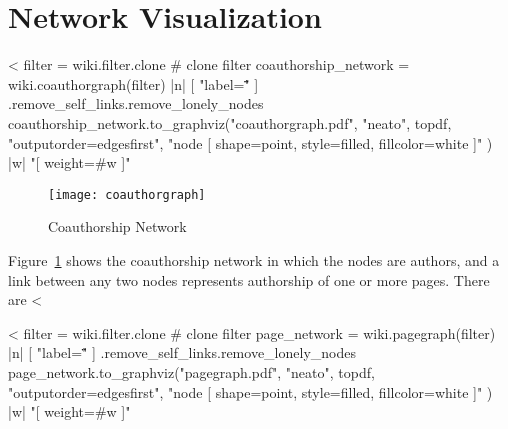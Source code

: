 \documentclass{scrartcl}
\begin{document}

\section{Network Visualization} %
\label{sec:network_visualization}

<%
filter = wiki.filter.clone # clone filter
coauthorship_network = wiki.coauthorgraph(filter) { |n| [ "label=\"\"" ] }.remove_self_links.remove_lonely_nodes
coauthorship_network.to_graphviz("coauthorgraph.pdf", "neato", topdf, "outputorder=edgesfirst", "node [ shape=point, style=filled, fillcolor=white ]" ) { |w|  "[ weight=#{w} ]" }
\begin{figure}[htbp]
	\centering
	\texttt{[image: coauthorgraph]}
	\caption{Coauthorship Network}
	\label{fig:coauthorship_network}
\end{figure}

Figure~\ref{fig:coauthorship_network} shows the coauthorship network in which the nodes are authors, and a link between any two nodes represents authorship of one or more pages. There are <%



<%
filter = wiki.filter.clone # clone filter
page_network = wiki.pagegraph(filter) { |n| [ "label=\"\"" ] }.remove_self_links.remove_lonely_nodes
page_network.to_graphviz("pagegraph.pdf", "neato", topdf, "outputorder=edgesfirst", "node [ shape=point, style=filled, fillcolor=white ]" ) { |w|  "[ weight=#{w} ]" }
\end{document}
